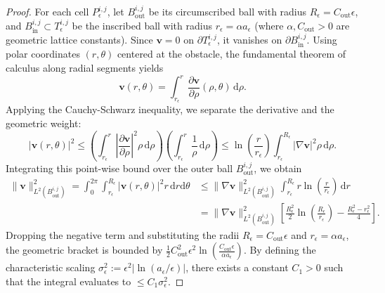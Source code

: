 \documentclass{elsarticle}
\begin{document}
\begin{proof}
    For each cell $P_\epsilon^{i,j}$, let $B_{\mathrm{out}}^{i,j}$ be its circumscribed ball with radius $R_{\epsilon} = C_{\mathrm{out}} \epsilon$, and $B_{\mathrm{in}}^{i,j} \subset T_{\epsilon}^{i,j}$ be the inscribed ball with radius $r_{\epsilon} = \alpha a_{\epsilon}$ (where $\alpha, C_{\mathrm{out}} > 0$ are geometric lattice constants). Since $\mathbf{v} = 0$ on $\partial T_{\epsilon}^{i,j}$, it vanishes on $\partial B_{\mathrm{in}}^{i,j}$. Using polar coordinates $(r, \theta)$ centered at the obstacle, the fundamental theorem of calculus along radial segments yields
    \begin{equation}
        \mathbf{v}(r, \theta) = \int_{r_{\epsilon}}^r \frac{\partial \mathbf{v}}{\partial \rho}(\rho, \theta) \, \mathrm{d}\rho.
    \end{equation}
    Applying the Cauchy-Schwarz inequality, we separate the derivative and the geometric weight:
    \begin{equation}
        |\mathbf{v}(r, \theta)|^2 \le \left( \int_{r_{\epsilon}}^r \left| \frac{\partial \mathbf{v}}{\partial \rho} \right|^2 \rho \, \mathrm{d}\rho \right) \left( \int_{r_{\epsilon}}^r \frac{1}{\rho} \, \mathrm{d}\rho \right) \le \ln\left(\frac{r}{r_{\epsilon}}\right) \int_{r_{\epsilon}}^{R_{\epsilon}} |\nabla \mathbf{v}|^2 \rho \, \mathrm{d}\rho.
    \end{equation}
    Integrating this point-wise bound over the outer ball $B_{\mathrm{out}}^{i,j}$, we obtain
    \begin{align}
        \|\mathbf{v}\|_{L^2(B_{\mathrm{out}}^{i,j})}^2 = \int_0^{2\pi} \int_{r_{\epsilon}}^{R_{\epsilon}} |\mathbf{v}(r, \theta)|^2 r \, \mathrm{d}r \mathrm{d}\theta & \le \|\nabla \mathbf{v}\|_{L^2(B_{\mathrm{out}}^{i,j})}^2 \int_{r_{\epsilon}}^{R_{\epsilon}} r \ln\left(\frac{r}{r_{\epsilon}}\right) \, \mathrm{d}r \nonumber                                 \\
                                                                                                                                                                      & = \|\nabla \mathbf{v}\|_{L^2(B_{\mathrm{out}}^{i,j})}^2 \left[ \frac{R_{\epsilon}^2}{2} \ln\left(\frac{R_{\epsilon}}{r_{\epsilon}}\right) - \frac{R_{\epsilon}^2 - r_{\epsilon}^2}{4} \right].
    \end{align}
    Dropping the negative term and substituting the radii $R_{\epsilon} = C_{\mathrm{out}}\epsilon$ and $r_{\epsilon} = \alpha a_{\epsilon}$, the geometric bracket is bounded by $\frac{1}{2} C_{\mathrm{out}}^2 \epsilon^2 \ln\left(\frac{C_{\mathrm{out}} \epsilon}{\alpha a_{\epsilon}}\right)$. By defining the characteristic scaling $\sigma_{\epsilon}^2 := \epsilon^2 |\ln(a_{\epsilon}/\epsilon)|$, there exists a constant $C_1 > 0$ such that the integral evaluates to $\le C_1 \sigma_{\epsilon}^2$.


\end{proof}
\end{document}
